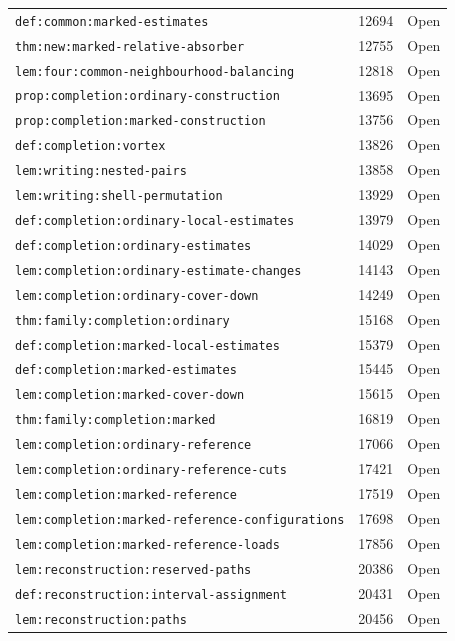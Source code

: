 \begin{tabular}{lll}
\nolinkurl{def:common:marked-estimates} & 12694 & Open \\
\nolinkurl{thm:new:marked-relative-absorber} & 12755 & Open \\
\nolinkurl{lem:four:common-neighbourhood-balancing} & 12818 & Open \\
\nolinkurl{prop:completion:ordinary-construction} & 13695 & Open \\
\nolinkurl{prop:completion:marked-construction} & 13756 & Open \\
\nolinkurl{def:completion:vortex} & 13826 & Open \\
\nolinkurl{lem:writing:nested-pairs} & 13858 & Open \\
\nolinkurl{lem:writing:shell-permutation} & 13929 & Open \\
\nolinkurl{def:completion:ordinary-local-estimates} & 13979 & Open \\
\nolinkurl{def:completion:ordinary-estimates} & 14029 & Open \\
\nolinkurl{lem:completion:ordinary-estimate-changes} & 14143 & Open \\
\nolinkurl{lem:completion:ordinary-cover-down} & 14249 & Open \\
\nolinkurl{thm:family:completion:ordinary} & 15168 & Open \\
\nolinkurl{def:completion:marked-local-estimates} & 15379 & Open \\
\nolinkurl{def:completion:marked-estimates} & 15445 & Open \\
\nolinkurl{lem:completion:marked-cover-down} & 15615 & Open \\
\nolinkurl{thm:family:completion:marked} & 16819 & Open \\
\nolinkurl{lem:completion:ordinary-reference} & 17066 & Open \\
\nolinkurl{lem:completion:ordinary-reference-cuts} & 17421 & Open \\
\nolinkurl{lem:completion:marked-reference} & 17519 & Open \\
\nolinkurl{lem:completion:marked-reference-configurations} & 17698 & Open \\
\nolinkurl{lem:completion:marked-reference-loads} & 17856 & Open \\
\nolinkurl{lem:reconstruction:reserved-paths} & 20386 & Open \\
\nolinkurl{def:reconstruction:interval-assignment} & 20431 & Open \\
\nolinkurl{lem:reconstruction:paths} & 20456 & Open \\

\end{tabular}
